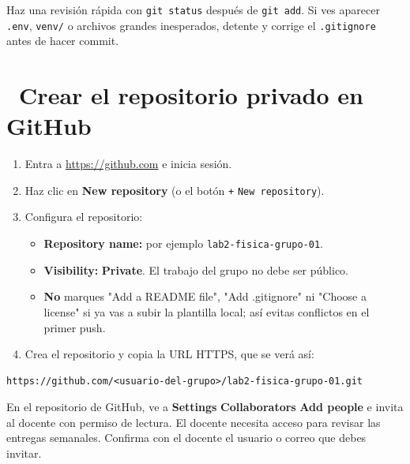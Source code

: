 \documentclass[11pt,a4paper]{article}
\newcommand{\iconotexto}[2]{\textcolor{cyanNeon}{\faIcon{#1}}~#2}
\begin{document}
\begin{cajaReto}
Haz una revisión rápida con \texttt{git status} después de \texttt{git add}. Si ves aparecer \texttt{.env}, \texttt{venv/} o archivos grandes inesperados, detente y corrige el \texttt{.gitignore} antes de hacer commit.
\end{cajaReto}

\section{\iconotexto{github}{Crear el repositorio privado en GitHub}}

\begin{enumerate}[leftmargin=1.6em,itemsep=4pt,topsep=2pt]
  \item Entra a \url{https://github.com} e inicia sesión.
  \item Haz clic en \textbf{New repository} (o el botón \texttt{+} \textrightarrow{} \texttt{New repository}).
  \item Configura el repositorio:
  \begin{itemize}[leftmargin=1.4em,itemsep=2pt,topsep=2pt]
    \item \textbf{Repository name:} por ejemplo \texttt{lab2-fisica-grupo-01}.
    \item \textbf{Visibility:} \textbf{Private}. El trabajo del grupo no debe ser público.
    \item \textbf{No} marques "Add a README file", "Add .gitignore" ni "Choose a license" si ya vas a subir la plantilla local; así evitas conflictos en el primer push.
  \end{itemize}
  \item Crea el repositorio y copia la URL HTTPS, que se verá así:
\end{enumerate}

\begin{lstlisting}
https://github.com/<usuario-del-grupo>/lab2-fisica-grupo-01.git
\end{lstlisting}

\begin{tcolorbox}[tarjetaDato,title={\faIcon{user-plus}~Agregar al docente como colaborador}]
En el repositorio de GitHub, ve a \textbf{Settings} \textrightarrow{} \textbf{Collaborators} \textrightarrow{} \textbf{Add people} e invita al docente con permiso de lectura. El docente necesita acceso para revisar las entregas semanales. Confirma con el docente el usuario o correo que debes invitar.
\end{tcolorbox}
\end{document}
